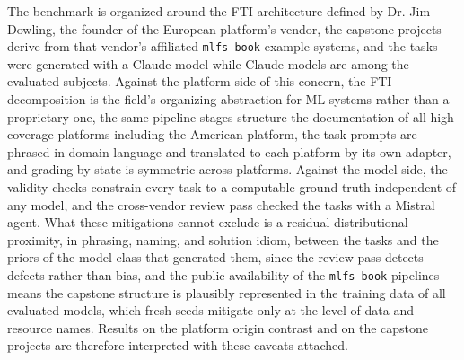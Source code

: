 \documentclass[
english,                 %
bibtex,                  %
]{kththesis}
\numberwithin{listing}{chapter}
\begin{document}
The benchmark is organized around the \gls{FTI} architecture defined by Dr. Jim Dowling, the founder of the European platform's vendor, the capstone projects derive from that vendor's affiliated \texttt{mlfs-book} example systems, and the tasks were generated with a Claude model while Claude models are among the evaluated subjects. Against the platform-side of this concern, the \gls{FTI} decomposition is the field's organizing abstraction for \gls{ML} systems rather than a proprietary one, the same pipeline stages structure the documentation of all high coverage platforms including the American platform, the task prompts are phrased in domain language and translated to each platform by its own adapter, and grading by state is symmetric across platforms. Against the model side, the validity checks constrain every task to a computable ground truth independent of any model, and the cross-vendor review pass checked the tasks with a Mistral agent. What these mitigations cannot exclude is a residual distributional proximity, in phrasing, naming, and solution idiom, between the tasks and the priors of the model class that generated them, since the review pass detects defects rather than bias, and the public availability of the \texttt{mlfs-book} pipelines means the capstone structure is plausibly represented in the training data of all evaluated models, which fresh seeds mitigate only at the level of data and resource names. Results on the platform origin contrast and on the capstone projects are therefore interpreted with these caveats attached.
\end{document}
